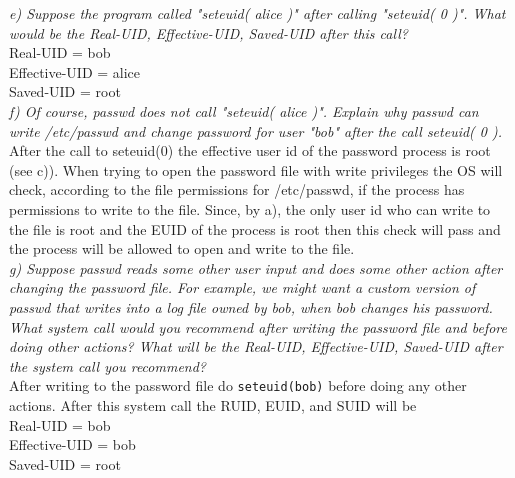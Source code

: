 \noindent \textit{e) Suppose the program called "seteuid( alice )" after calling "seteuid( 0 )". What would be the Real-UID, Effective-UID, Saved-UID after this call?}\\

      \indent Real-UID = bob \\
      \indent Effective-UID = alice\\ 
      \indent Saved-UID = root \\

\noindent \textit{f) Of course, passwd does not call "seteuid( alice )". Explain why passwd can write /etc/passwd and change password for user "bob" after the call seteuid( 0 ).}\\

\noindent After the call to seteuid(0) the effective user id of the password process is root (see c)). When trying to open the password file with write privileges the OS will check, according to the file permissions for /etc/passwd, if the process has permissions to write to the file. Since, by a), the only user id who can write to the file is root and the EUID of the process is root then this check will pass and the process will be allowed to open and write to the file.\\

\noindent \textit{g) Suppose passwd reads some other user input and does some other action after changing the password file. For example, we might want a custom version of passwd that writes into a log file owned by bob, when bob changes his password. What system call would you recommend after writing the password file and before doing other actions? What will be the Real-UID, Effective-UID, Saved-UID after the system call you recommend?}\\

\noindent After writing to the password file do \verb+seteuid(bob)+ before doing any other actions. After this system call the RUID, EUID, and SUID will be\\

      \indent Real-UID = bob \\
      \indent Effective-UID = bob\\ 
      \indent Saved-UID = root \\


%
%
